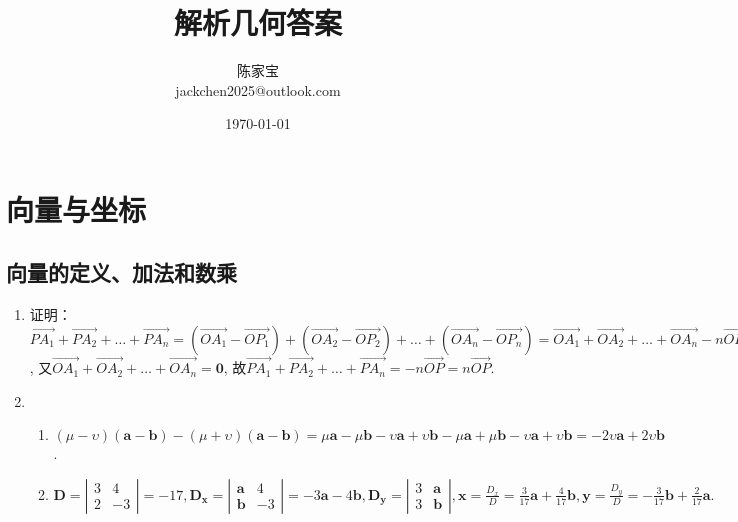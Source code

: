\documentclass[UTF8]{ctexart}
\title{解析几何答案}
\author{陈家宝\\jackchen2025@outlook.com}
\date{\today}
\begin{document}
\maketitle
\tableofcontents
\section{向量与坐标}
\subsection{向量的定义、加法和数乘}

\begin{enumerate}
\item 证明：$\overrightarrow{PA_1}+\overrightarrow{PA_2}+ \dots +\overrightarrow{PA_n}=\left(\overrightarrow{OA_1}-\overrightarrow{OP_1}\right)+\left(\overrightarrow{OA_2}-\overrightarrow{OP_2}\right)+ \dots +\left(\overrightarrow{OA_n}-\overrightarrow{OP_n}\right)=\overrightarrow{OA_1}+\overrightarrow{OA_2}+ \dots +\overrightarrow{OA_n}-n\overrightarrow{OP}$,
又$\overrightarrow{OA_1}+\overrightarrow{OA_2}+ \dots +\overrightarrow{OA_n}=\boldsymbol{0}$,
故$\overrightarrow{PA_1}+\overrightarrow{PA_2}+ \dots +\overrightarrow{PA_n}=-n\overrightarrow{OP}=n\overrightarrow{OP}.$

\item 
\begin{enumerate}[(1)]
\item $\left(\mu - \upsilon\right)\left(\boldsymbol{a}-\boldsymbol{b}\right)-\left(\mu + \upsilon\right)\left(\boldsymbol{a}-\boldsymbol{b}\right)=\mu \boldsymbol{a}-\mu \boldsymbol{b}-\upsilon \boldsymbol{a}+\upsilon \boldsymbol{b}-\mu \boldsymbol{a}+\mu \boldsymbol{b}-\upsilon \boldsymbol{a}+\upsilon \boldsymbol{b}=-2\upsilon \boldsymbol{a}+2\upsilon \boldsymbol{b}$.
\item 
$\mathbf{D}=\left|\begin{array}{ccc}
3 & 4\\
2 & -3
\end{array} \right|
=-17,\mathbf{D_x}=\left|\begin{array}{ccc}\mathbf{a}&4\\ \mathbf{b}&-3\end{array}\right| =-3\mathbf{a}-4\mathbf{b},
\mathbf{D_y}=\left|\begin{array}{ccc} 3 & \mathbf{a}\\ 3 & \mathbf{b}\end{array}\right|,\mathbf{x}=\displaystyle\frac{D_x}{D}=\displaystyle\frac{3}{17}\mathbf{a}+\displaystyle\frac{4}{17}\mathbf{b},\mathbf{y}=\displaystyle\frac{D_y}{D}=-\displaystyle\frac{3}{17}\mathbf{b}+\displaystyle\frac{2}{17}\mathbf{a}.$
\end{enumerate}


\end{enumerate}
\end{document}
